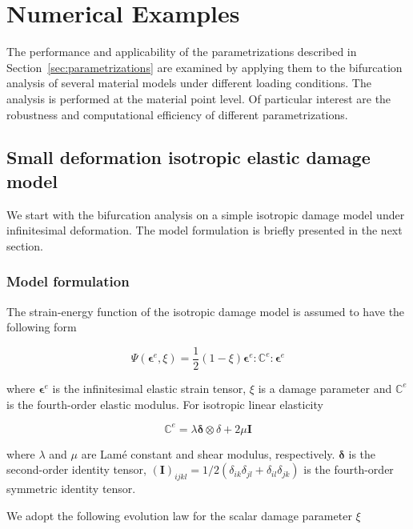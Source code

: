 \documentclass[12pt]{article}
\newcommand{\mbs}[1]{\boldsymbol{#1}}
\def\bdelta{{\mbs{\delta}}}
\def\bepsilon{{\mbs{\epsilon}}}
\newcommand{\tensor}[1]{\ensuremath{\boldsymbol{#1}}}
\numberwithin{equation}{section}
\begin{document}
\section{Numerical Examples}
\label{sec:numerical-examples}

The performance and applicability of the parametrizations described in
Section~\ref{sec:parametrizations} are examined by applying them to 
the bifurcation analysis of several material models under different 
loading conditions. The analysis is performed at the material point 
level. Of particular interest are the robustness and computational 
efficiency of different parametrizations.

\subsection{Small deformation isotropic elastic damage model}
\label{subsec:isotropic}

We start with the bifurcation analysis on a simple isotropic damage 
model under infinitesimal deformation. The model formulation is 
briefly presented in the next section.

\subsubsection{Model formulation}
The strain-energy function of the isotropic damage model is assumed to 
have the following form

\begin{equation}\label{eq:iso_psi}
 \Psi(\bepsilon ^e, \xi)
   = \frac{1}{2} (1 - \xi) 
     \bepsilon ^e : \mathbb{C}^e : \bepsilon ^e
\end{equation}

where $\bepsilon^e$ is the infinitesimal elastic strain tensor, $\xi$ 
is a damage parameter and $\mathbb{C}^e$ is the fourth-order elastic
modulus. For isotropic linear elasticity

\begin{equation}
  \mathbb{C}^e = \lambda \bdelta\otimes\delta + 2\mu\tensor I
\end{equation}

where $\lambda$ and $\mu$ are Lam\'{e} constant and shear modulus,
respectively. $\bdelta$ is the second-order identity tensor,
$(\tensor I)_{ijkl} = 1/2(\delta_{ik}\delta_{jl} +
\delta_{il}\delta_{jk})$ is the fourth-order symmetric identity
tensor.

We adopt the following evolution law for the scalar damage parameter $
\xi$ \cite{Holzapfel:2000}
\end{document}
